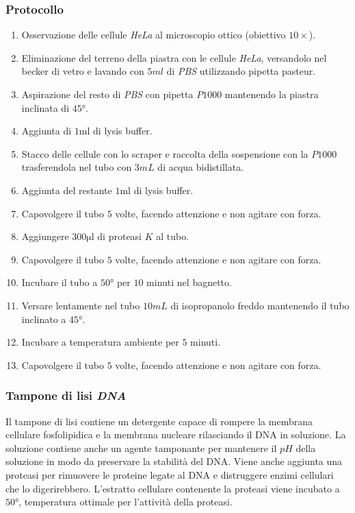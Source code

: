 		\subsubsection{Protocollo}
		\begin{enumerate}
			\item Osservazione delle cellule \emph{HeLa} al microscopio ottico (obiettivo $10\times$).
			\item Eliminazione del terreno della piastra con le cellule \emph{HeLa}, versandolo nel becker di vetro e lavando con $5\si{ml}$ di \emph{PBS} utilizzando pipetta pasteur.
			\item Aspirazione del resto di \emph{PBS} con pipetta $P1000$ mantenendo la piastra inclinata di $45\si{\degree}$.
			\item Aggiunta di $1\si{\milli\litre}$ di lysis buffer.
			\item Stacco delle cellule con lo scraper e raccolta della sospensione con la $P1000$ trasferendola nel tubo con $3\si{mL}$ di acqua bidistillata.
			\item Aggiunta del restante $1\si{\milli\litre}$ di lysis buffer.
			\item Capovolgere il tubo $5$ volte, facendo attenzione e non agitare con forza.
			\item Aggiungere $300\si{\micro\litre}$ di proteasi $K$ al tubo.
			\item Capovolgere il tubo $5$ volte, facendo attenzione e non agitare con forza.
			\item Incubare il tubo a $50\si{\degree}$ per $10$ minuti nel bagnetto.
			\item Versare lentamente nel tubo $10\si{mL}$ di isopropanolo freddo mantenendo il tubo inclinato a $45\si{\degree}$.
			\item Incubare a temperatura ambiente per $5$ minuti.
			\item Capovolgere il tubo $5$ volte, facendo attenzione e non agitare con forza.
		\end{enumerate}

		\subsubsection{Tampone di lisi \emph{DNA}}
		Il tampone di lisi contiene un detergente capace di rompere la membrana cellulare fosfolipidica e la membrana nucleare rilasciando il DNA in soluzione.
		La soluzione contiene anche un agente tamponante per mantenere il $pH$ della soluzione in modo da preservare la stabilit\`a del DNA.
		Viene anche aggiunta una proteasi per rimuovere le proteine legate al DNA e distruggere enzimi cellulari che lo digerirebbero.
		L'estratto cellulare contenente la proteasi viene incubato a $50\si{\degree}$, temperatura ottimale per l'attivit\`a della proteasi.

